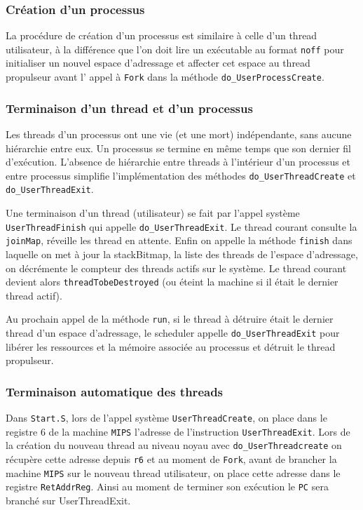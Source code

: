 \documentclass[11pt]{article}
\theoremstyle{definition}
\theoremstyle{definition}
\begin{document}
\subsubsection{Création d'un processus}
La procédure de création d'un processus est similaire à celle d'un thread utilisateur, à la différence que l'on doit lire un exécutable au format \texttt{noff} pour initialiser un nouvel espace d'adressage et affecter cet espace au thread propulseur avant l' appel à \texttt{Fork} dans la méthode \texttt{do\_UserProcessCreate}.

\subsubsection{Terminaison d'un thread et d'un processus}
Les threads d'un processus ont une vie (et une mort) indépendante, sans aucune hiérarchie entre eux.
Un processus se termine en même temps que son dernier fil d'exécution.
L'absence de hiérarchie entre threads à l'intérieur d'un processus et entre processus simplifie
l'implémentation des méthodes \texttt{do\_UserThreadCreate} et \texttt{do\_UserThreadExit}.

Une terminaison d'un thread (utilisateur) se fait par l'appel système \texttt{UserThreadFinish} qui appelle \texttt{do\_UserThreadExit}. Le thread courant consulte la \texttt{joinMap}, réveille les thread en attente. Enfin on appelle la méthode \texttt{finish} dans laquelle on met à jour la stackBitmap, la liste des threads de l'espace d'adressage, on décrémente le compteur des threads actifs sur le système. Le thread courant devient alors \texttt{threadTobeDestroyed} (ou éteint la machine si il était le dernier thread actif).

Au prochain appel de la méthode \texttt{run}, si le thread à détruire était le dernier thread d'un espace d'adressage, le scheduler appelle \texttt{do\_UserThreadExit} pour libérer les ressources et la mémoire associée au processus et détruit le thread propulseur.

\subsubsection{Terminaison automatique des threads}
Dans \texttt{Start.S}, lors de l'appel système \texttt{UserThreadCreate}, on place dans le registre $6$ de la machine \texttt{MIPS} l'adresse de l'instruction \texttt{UserThreadExit}.
Lors de la création du nouveau thread au niveau noyau avec \texttt{do\_UserThreadcreate} on récupère
cette adresse depuis \texttt{r6} et au moment de \texttt{Fork}, avant de brancher la machine \texttt{MIPS} sur
le nouveau thread utilisateur, on place cette adresse dans le registre \texttt{RetAddrReg}. Ainsi au moment de terminer son exécution le \texttt{PC} sera branché sur UserThreadExit.
\end{document}
